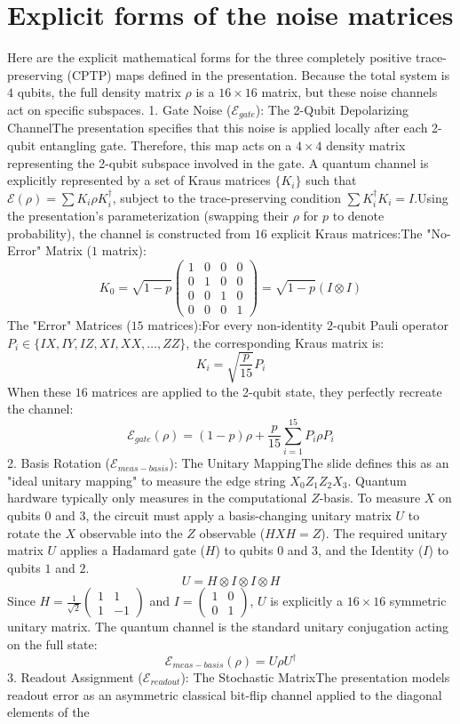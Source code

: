 \documentclass[11pt]{article}
\begin{document}
\section{Explicit forms of the noise matrices}

Here are the explicit mathematical forms for the three completely positive trace-preserving (CPTP) maps defined in the presentation. Because the total system is $4$ qubits, the full density matrix $\rho$ is a $16 \times 16$ matrix, but these noise channels act on specific subspaces.  1. Gate Noise ($\mathcal{E}_{gate}$): The 2-Qubit Depolarizing ChannelThe presentation specifies that this noise is applied locally after each 2-qubit entangling gate. Therefore, this map acts on a $4 \times 4$ density matrix representing the 2-qubit subspace involved in the gate.  A quantum channel is explicitly represented by a set of Kraus matrices $\{K_i\}$ such that $\mathcal{E}(\rho) = \sum K_i \rho K_i^\dagger$, subject to the trace-preserving condition $\sum K_i^\dagger K_i = I$.Using the presentation's parameterization (swapping their $\rho$ for $p$ to denote probability), the channel is constructed from $16$ explicit Kraus matrices:The "No-Error" Matrix ($1$ matrix):$$K_0 = \sqrt{1-p} \begin{pmatrix} 1 & 0 & 0 & 0 \\ 0 & 1 & 0 & 0 \\ 0 & 0 & 1 & 0 \\ 0 & 0 & 0 & 1 \end{pmatrix} = \sqrt{1-p} (I \otimes I)$$The "Error" Matrices ($15$ matrices):For every non-identity 2-qubit Pauli operator $P_i \in \{IX, IY, IZ, XI, XX, \dots, ZZ\}$, the corresponding Kraus matrix is:$$K_i = \sqrt{\frac{p}{15}} P_i$$When these $16$ matrices are applied to the 2-qubit state, they perfectly recreate the channel:$$\mathcal{E}_{gate}(\rho) = (1-p)\rho + \frac{p}{15} \sum_{i=1}^{15} P_i \rho P_i$$2. Basis Rotation ($\mathcal{E}_{meas-basis}$): The Unitary MappingThe slide defines this as an "ideal unitary mapping" to measure the edge string $X_0 Z_1 Z_2 X_3$. Quantum hardware typically only measures in the computational $Z$-basis. To measure $X$ on qubits $0$ and $3$, the circuit must apply a basis-changing unitary matrix $U$ to rotate the $X$ observable into the $Z$ observable ($H X H = Z$).  The required unitary matrix $U$ applies a Hadamard gate ($H$) to qubits $0$ and $3$, and the Identity ($I$) to qubits $1$ and $2$.$$U = H \otimes I \otimes I \otimes H$$Since $H = \frac{1}{\sqrt{2}}\begin{pmatrix} 1 & 1 \\ 1 & -1 \end{pmatrix}$ and $I = \begin{pmatrix} 1 & 0 \\ 0 & 1 \end{pmatrix}$, $U$ is explicitly a $16 \times 16$ symmetric unitary matrix. The quantum channel is the standard unitary conjugation acting on the full state:$$\mathcal{E}_{meas-basis}(\rho) = U \rho U^\dagger$$3. Readout Assignment ($\mathcal{E}_{readout}$): The Stochastic MatrixThe presentation models readout error as an asymmetric classical bit-flip channel applied to the diagonal elements of the 
\end{document}
